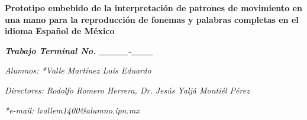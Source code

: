 \begin{center}
    \vspace*{1cm}
    
    {\fontsize{14}{16} \textbf{Prototipo embebido de la interpretación de patrones de movimiento en una mano para la reproducción de fonemas y palabras completas en el idioma Español de México}}
    
    \vspace{0.2cm}
    
    {\fontsize{12}{14} \textbf{\textit{Trabajo Terminal No. \_\_\_\_-\_\_\_}} }
    
    \vspace{0.1cm}
    
    \textit{Alumnos: *Valle Martínez Luis Eduardo}
    
    \vspace{0.1cm}
    
    \textit{Directores: Rodolfo Romero Herrera, Dr. Jesús Yaljá Montiél Pérez}
    
    \vspace{0.1cm}
    
    \textit{*e-mail: lvallem1400@alumno.ipn.mx}
    
\end{center}